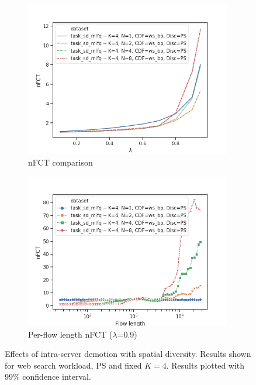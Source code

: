 \begin{figure}
	\centering
	\begin{subfigure}{.5\textwidth}
		\centering
		\includegraphics[width=0.99\textwidth]{Chapter3/Figures/sd_mlfq_k4_comparison.png}
		\caption{nFCT comparison}
		\label{fig:sdmlfq-variable-N-fct}
	\end{subfigure}%
	\hfill
	\begin{subfigure}{.5\textwidth}
		\centering
		\includegraphics[width=0.99\textwidth]{Chapter3/Figures/sd_mlfq_k4_detailed.png}
		\caption{Per-flow length nFCT ($\lambda$=0.9)}
		\label{fig:sdmlfq-variable-N-fct-detailed}
	\end{subfigure}
	\caption{Effects of intra-server demotion with spatial diversity. Results shown for web search workload, PS and fixed $K=4$. Results plotted with 99\% confidence interval.}
	\label{fig:sdmlfq-variable-N}
\end{figure}
